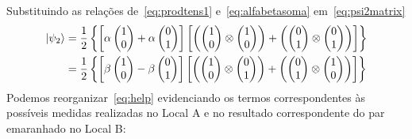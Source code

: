 Substituindo as relações de~\eqref{eq:prodtens1} e~\eqref{eq:alfabetasoma} em~\eqref{eq:psi2matrix}
\begin{equation}\label{eq:help}
  \begin{split}
\ket{\psi_2} &= \frac{1}{2}\left\{\left[\alpha\begin{pmatrix}
1 \\
0
\end{pmatrix}+\alpha\begin{pmatrix}
0 \\
1
\end{pmatrix}\right]\left[\left(\begin{pmatrix}
1 \\
0
\end{pmatrix} \otimes \begin{pmatrix}
1 \\
0
\end{pmatrix}\right) + \left(\begin{pmatrix}
0 \\
1
\end{pmatrix} \otimes \begin{pmatrix}
0 \\
1
\end{pmatrix}\right)\right]\right\} \nonumber \\
&= \frac{1}{2}\left\{\left[\beta\begin{pmatrix}
1 \\
0
\end{pmatrix}-\beta\begin{pmatrix}
0 \\
1
\end{pmatrix}\right]\left[\left(\begin{pmatrix}
1 \\
0
\end{pmatrix} \otimes \begin{pmatrix}
0 \\
1
\end{pmatrix}\right) + \left(\begin{pmatrix}
0 \\
1
\end{pmatrix} \otimes \begin{pmatrix}
1 \\
0
\end{pmatrix}\right)\right]\right\}
  \end{split}
\end{equation}
Podemos reorganizar~\eqref{eq:help} evidenciando os termos correspondentes às possíveis medidas realizadas no Local A e no resultado correspondente do par emaranhado no Local B:

